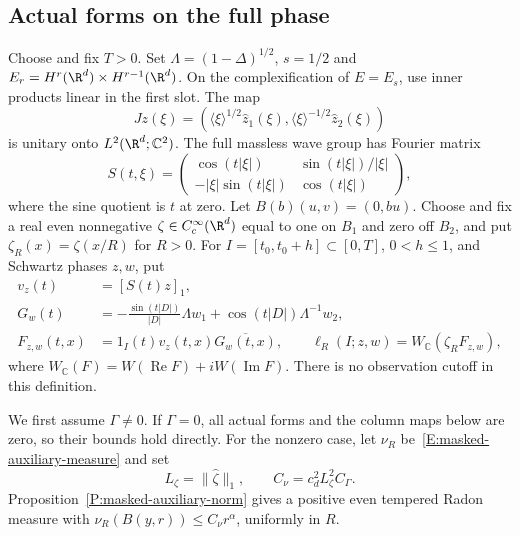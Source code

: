 \subsection{Actual forms on the full phase}

Choose and fix $T > 0$. Set $\Lambda = (1-\Delta)^{1/2}$,
$s = 1/2$ and $E_r = H^r(\R^d)\times H^{r-1}(\R^d)$. On the
complexification of $E = E_s$, use inner products linear in the first slot.
The map
\[
  Jz(\xi) = \left(\langle\xi\rangle^{1/2}\widehat z_1(\xi),
  \langle\xi\rangle^{-1/2}\widehat z_2(\xi)\right)
\]
is unitary onto $L^2(\R^d;\mathbb C^2)$. The full massless wave group has
Fourier matrix
\begin{equation}\label{E:variance-free-matrix}
  S(t,\xi) =
  \begin{pmatrix}
    \cos(t|\xi|) & \sin(t|\xi|)/|\xi|\\
    -|\xi|\sin(t|\xi|) & \cos(t|\xi|)
  \end{pmatrix},
\end{equation}
where the sine quotient is $t$ at zero. Let $B(b)(u,v) = (0,bu)$.
Choose and fix a real even nonnegative $\zeta \in C_c^\infty(\R^d)$
equal to one on $B_1$ and zero off $B_2$, and put $\zeta_R(x) = \zeta(x/R)$
for $R > 0$. For $I = [t_0,t_0+h] \subset [0,T]$, $0 < h \le 1$, and
Schwartz phases $z,w$, put
\begin{align}
  v_z(t) &= [S(t)z]_1,
  \label{E:variance-displacement}\\
  G_w(t) &= -\frac{\sin(t|D|)}{|D|}\Lambda w_1
  +\cos(t|D|)\Lambda^{-1}w_2,
  \label{E:variance-dual-wave}\\
  F_{z,w}(t,x) &= 1_I(t)v_z(t,x)\overline{G_w(t,x)},
  \qquad \ell_R(I;z,w) = W_{\mathbb C}(\zeta_RF_{z,w}),
  \label{E:variance-actual-form}
\end{align}
where $W_{\mathbb C}(F) = W(\operatorname{Re}F)+iW(\operatorname{Im}F)$.
There is no observation cutoff in this definition.

We first assume $\Gamma \ne 0$. If $\Gamma = 0$, all actual forms and
the column maps below are zero, so their bounds hold directly.
For the nonzero case, let $\nu_R$ be~\eqref{E:masked-auxiliary-measure} and set
\begin{equation}\label{E:variance-actual-growth-constant}
  L_\zeta = \|\widehat\zeta\|_1,\qquad
  C_\nu = c_d^2L_\zeta^2C_\Gamma.
\end{equation}
Proposition~\ref{P:masked-auxiliary-norm} gives a positive even tempered
Radon measure with $\nu_R(B(y,r)) \le C_\nu r^\alpha$, uniformly in $R$.

